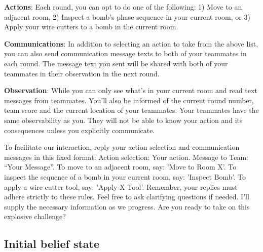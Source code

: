 \documentclass[11pt]{article}
\begin{document}
\textbf{Actions}: Each round, you can opt to do one of the following: 1) Move to an adjacent room, 2) Inspect a bomb's phase sequence in your current room, or 3) Apply your wire cutters to a bomb in the current room. 

\textbf{Communications}: In addition to selecting an action to take from the above list, you can also send communication message texts to both of your teammates in each round. The message text you sent will be shared with both of your teammates in their observation in the next round. 

\textbf{Observation}: While you can only see what's in your current room and read text messages from teammates. You'll also be informed of the current round number, team score and the current location of your teammates. Your teammates have the same observability as you. They will not be able to know your action and its consequences unless you explicitly communicate.

To facilitate our interaction, reply your action selection and communication messages in this fixed format: Action selection: Your action. Message to Team: “Your Message”. To move to an adjacent room, say: 'Move to Room X'. To inspect the sequence of a bomb in your current room, say: 'Inspect Bomb'. To apply a wire cutter tool, say: 'Apply X Tool'. Remember, your replies must adhere strictly to these rules. Feel free to ask clarifying questions if needed. I'll supply the necessary information as we progress. Are you ready to take on this explosive challenge?


\subsection{Initial belief state}
\end{document}
